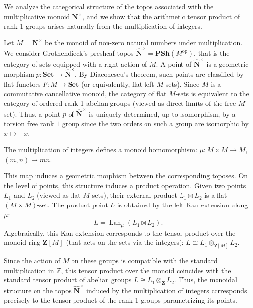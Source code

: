 \documentclass[11pt,a4paper]{article}
\newcommand{\N}{\mathbf{N}}
\def\N{{\mathbf N}}
\def\nat{\widehat{\N}^\times}
\theoremstyle{plain}
\theoremstyle{definition} %
\begin{document}
We analyze the categorical structure of the topos associated with the multiplicative monoid $\mathbf{N}^\times$, and we show that the arithmetic tensor product of rank-1 groups arises naturally from the multiplication of integers.

Let $M = \mathbf{N}^\times$ be the monoid of non-zero natural numbers under multiplication. We consider Grothendieck's presheaf topos $\nat = \mathbf{PSh}(M^{\mathrm{op}})$, that is the category of sets equipped with a right action of $M$.
A point of  $\nat$ is a geometric morphism $p: \mathbf{Set} \to \nat$. By Diaconescu's theorem, such points are classified by flat functors $F: M \to \mathbf{Set}$ (or equivalently, flat left $M$-sets).
Since $M$ is a commutative cancellative monoid, the category of flat $M$-sets is equivalent to the category of ordered  rank-1 abelian groups (viewed as direct limits of the free $M$-set). Thus, a point $p$ of $\nat$ is uniquely determined, up to isomorphism, by a torsion free rank $1$  group since the two orders on such a group are isomorphic by $x\mapsto -x$.

The multiplication of integers defines a monoid homomorphism:
$
\mu: M \times M \rightarrow M$, $(m, n) \mapsto mn$.

This map induces a geometric morphism between the corresponding toposes. On the level of points, this structure induces a product operation. Given two points $L_1$ and $L_2$ (viewed as flat $M$-sets), their external product $L_1 \boxtimes L_2$ is a flat $(M \times M)$-set. The product point $L$ is obtained by the left Kan extension along $\mu$:
\[
L = \operatorname{Lan}_\mu (L_1 \boxtimes L_2).
\]
Algebraically, this Kan extension corresponds to the tensor product over the monoid ring $\mathbf{Z}[M]$ (that acts on the sets via the integers): $
L \cong L_1 \otimes_{\mathbf{Z}[M]} L_2$.

Since the action of $M$ on these groups is compatible with the standard multiplication in $\mathbb{Z}$, this tensor product over the monoid coincides with the standard tensor product of abelian groups $
L \cong L_1 \otimes_{\mathbf{Z}} L_2$. 
Thus, the monoidal structure on the topos $\nat$ induced by the multiplication of integers corresponds precisely to the tensor product of the rank-1 groups parametrizing its points.






\iffalse
\end{document}
